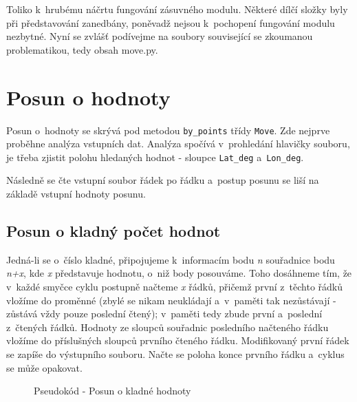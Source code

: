 Toliko k~hrubému náčrtu fungování zásuvného modulu. Některé dílčí složky byly při představování
zane\-dbány, poněvadž nejsou k~pochopení fungování mo\-dulu nezbytné. Nyní se zvlášť podívejme na
soubory související se zkoumanou pro\-blematikou, tedy obsah move.py. 


\section{Posun o hodnoty}
\label{by_points}

Posun o~hodnoty se skrývá pod metodou {\tt by\_points} třídy {\tt Move}.
Zde nejprve proběhne analýza vstupních dat.
Analýza spočívá v~prohledání hlavičky souboru, je třeba zjistit polohu hledaných hodnot - sloupce
{\tt Lat\_deg} a~{\tt Lon\_deg}. 

Následně se čte vstupní soubor řádek po řádku a~postup posunu se liší na základě vstupní hodnoty posunu. 

\subsection{Posun o kladný počet hodnot}
\label{kladnehodnoty}

Jedná-li se o~číslo kladné, připojujeme k~informacím bodu \textit{n} souřadnice bodu
\textit{n+x}, kde \textit{x} představuje hodnotu, o~niž body posouváme. Toho dosáhneme tím, že
v~každé smyčce cyklu postupně načteme \textit{x} řádků, přičemž první z~těchto řádků vložíme do proměnné
(zbylé se nikam neukládají a~v~paměti tak nezůstávají - zůstává vždy pouze poslední čtený);
v~paměti tedy zbude první a~poslední z~čtených řádků. Hodnoty ze sloupců souřadnic posledního
načteného řádku vložíme do příslušných sloupců prvního čteného řádku. Modifikovaný první
řádek se zapíše do výstupního souboru. Načte se poloha konce prvního řádku a~cyklus se může opakovat. 

    \begin{figure}
    \centering
    \begin{algorithmic}[1]
    \ENDWHILE
    \end{algorithmic}
    \caption{Pseudokód - Posun o kladné hodnoty}
    \label{fig:pseudokladnehodnoty}
    \end{figure}

